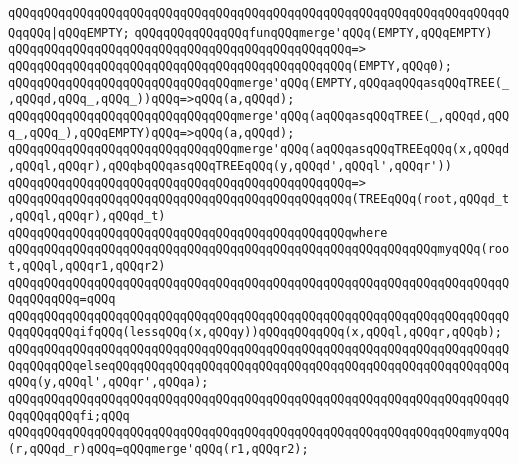 \verb|qQQqqQQqqQQqqQQqqQQqqQQqqQQqqQQqqQQqqQQqqQQqqQQqqQQqqQQqqQQqqQQqqQQqqQQqqQQq|\verb#|qQQqEMPTY;#\newline
\newline
\verb|qQQqqQQqqQQqqQQqfunqQQqmerge'qQQq(EMPTY,qQQqEMPTY)|\newline
\verb|qQQqqQQqqQQqqQQqqQQqqQQqqQQqqQQqqQQqqQQqqQQqqQQq=>|\newline
\verb|qQQqqQQqqQQqqQQqqQQqqQQqqQQqqQQqqQQqqQQqqQQqqQQq(EMPTY,qQQq0);|\newline
\newline
\verb|qQQqqQQqqQQqqQQqqQQqqQQqqQQqqQQqmerge'qQQq(EMPTY,qQQqaqQQqasqQQqTREE(_,qQQqd,qQQq_,qQQq_))qQQq=>qQQq(a,qQQqd);|\newline
\verb|qQQqqQQqqQQqqQQqqQQqqQQqqQQqqQQqmerge'qQQq(aqQQqasqQQqTREE(_,qQQqd,qQQq_,qQQq_),qQQqEMPTY)qQQq=>qQQq(a,qQQqd);|\newline
\newline
\verb|qQQqqQQqqQQqqQQqqQQqqQQqqQQqqQQqmerge'qQQq(aqQQqasqQQqTREEqQQq(x,qQQqd,qQQql,qQQqr),qQQqbqQQqasqQQqTREEqQQq(y,qQQqd',qQQql',qQQqr'))|\newline
\verb|qQQqqQQqqQQqqQQqqQQqqQQqqQQqqQQqqQQqqQQqqQQqqQQq=>|\newline
\verb|qQQqqQQqqQQqqQQqqQQqqQQqqQQqqQQqqQQqqQQqqQQqqQQq(TREEqQQq(root,qQQqd_t,qQQql,qQQqr),qQQqd_t)|\newline
\verb|qQQqqQQqqQQqqQQqqQQqqQQqqQQqqQQqqQQqqQQqqQQqqQQqwhere|\newline
\verb|qQQqqQQqqQQqqQQqqQQqqQQqqQQqqQQqqQQqqQQqqQQqqQQqqQQqqQQqqQQqmyqQQq(root,qQQql,qQQqr1,qQQqr2)|\newline
\verb|qQQqqQQqqQQqqQQqqQQqqQQqqQQqqQQqqQQqqQQqqQQqqQQqqQQqqQQqqQQqqQQqqQQqqQQqqQQqqQQq=qQQq|\newline
\verb|qQQqqQQqqQQqqQQqqQQqqQQqqQQqqQQqqQQqqQQqqQQqqQQqqQQqqQQqqQQqqQQqqQQqqQQqqQQqqQQqifqQQq(lessqQQq(x,qQQqy))qQQqqQQqqQQq(x,qQQql,qQQqr,qQQqb);|\newline
\verb|qQQqqQQqqQQqqQQqqQQqqQQqqQQqqQQqqQQqqQQqqQQqqQQqqQQqqQQqqQQqqQQqqQQqqQQqqQQqqQQqelseqQQqqQQqqQQqqQQqqQQqqQQqqQQqqQQqqQQqqQQqqQQqqQQqqQQqqQQqqQQq(y,qQQql',qQQqr',qQQqa);|\newline
\verb|qQQqqQQqqQQqqQQqqQQqqQQqqQQqqQQqqQQqqQQqqQQqqQQqqQQqqQQqqQQqqQQqqQQqqQQqqQQqqQQqfi;qQQq|\newline
\newline
\verb|qQQqqQQqqQQqqQQqqQQqqQQqqQQqqQQqqQQqqQQqqQQqqQQqqQQqqQQqqQQqqQQqmyqQQq(r,qQQqd_r)qQQq=qQQqmerge'qQQq(r1,qQQqr2);|\newline
\newline
